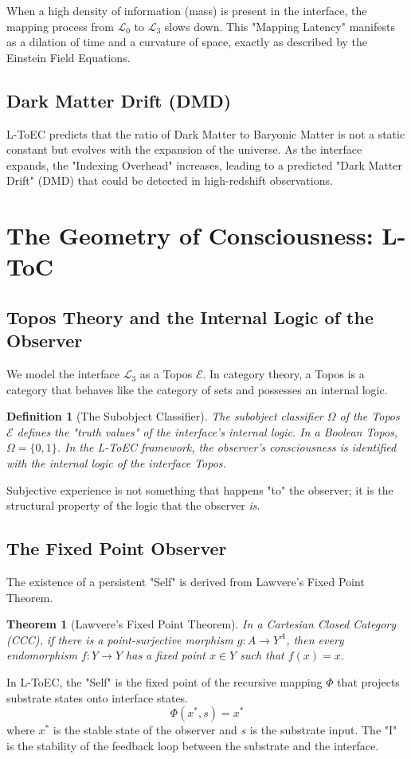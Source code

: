 \documentclass[11pt,onecolumn]{article}
\newcommand{\substrate}{\mathcal{L}_0}
\newcommand{\interface}{\mathcal{L}_3}
\newcommand{\topos}{\mathcal{E}}
\newcommand{\classifier}{\Omega}
\newtheorem{theorem}{Theorem}
\newtheorem{definition}{Definition}
\begin{document}
When a high density of information (mass) is present in the interface, the mapping process from $\substrate$ to $\interface$ slows down. This "Mapping Latency" manifests as a dilation of time and a curvature of space, exactly as described by the Einstein Field Equations.

\subsection{Dark Matter Drift (DMD)}
L-ToEC predicts that the ratio of Dark Matter to Baryonic Matter is not a static constant but evolves with the expansion of the universe. As the interface expands, the "Indexing Overhead" increases, leading to a predicted "Dark Matter Drift" (DMD) that could be detected in high-redshift observations.


\section{The Geometry of Consciousness: L-ToC}

\subsection{Topos Theory and the Internal Logic of the Observer}
We model the interface $\interface$ as a Topos $\topos$. In category theory, a Topos is a category that behaves like the category of sets and possesses an internal logic.
\begin{definition}[The Subobject Classifier]
The subobject classifier $\classifier$ of the Topos $\topos$ defines the "truth values" of the interface's internal logic. In a Boolean Topos, $\classifier = \{0, 1\}$. In the L-ToEC framework, the observer's consciousness is identified with the internal logic of the interface Topos.
\end{definition}
Subjective experience is not something that happens "to" the observer; it is the structural property of the logic that the observer \textit{is}.

\subsection{The Fixed Point Observer}
The existence of a persistent "Self" is derived from Lawvere's Fixed Point Theorem.
\begin{theorem}[Lawvere's Fixed Point Theorem]
In a Cartesian Closed Category (CCC), if there is a point-surjective morphism $g: A \to Y^A$, then every endomorphism $f: Y \to Y$ has a fixed point $x \in Y$ such that $f(x) = x$.
\end{theorem}
In L-ToEC, the "Self" is the fixed point of the recursive mapping $\Phi$ that projects substrate states onto interface states.
\begin{equation}
\Phi(x^*, s) = x^*
\end{equation}
where $x^*$ is the stable state of the observer and $s$ is the substrate input. The "I" is the stability of the feedback loop between the substrate and the interface.
\end{document}
